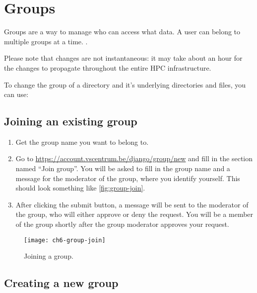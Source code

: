 \section{Groups}
\label{sec:vcs-groups}

Groups are a way to manage who can access what data. A user can belong to multiple
groups at a time. .

Please note that changes are not instantaneous: it may take about an hour for the changes to propagate
throughout the entire HPC infrastructure.

To change the group of a directory and it's underlying directories and files, you can use:

\begin{prompt}
\end{prompt}

\subsection{Joining an existing group}
\label{subsec:joining-existing-group}

\begin{enumerate}
    \item Get the group name you want to belong to.
    \item Go to \url{https://account.vscentrum.be/django/group/new} and fill in the
        section named ``Join group''. You will be asked to fill in the group name and a message for
        the moderator of the group, where you identify yourself. This should look something
        like \autoref{fig:group-join}.
    \item After clicking the submit button, a message will be sent to the moderator
        of the group, who will either approve or deny the request. You will be a member of the
        group shortly after the group moderator approves your request.
\end{enumerate}

\begin{figure}[!htbp]
  \caption{Joining a group.}
  \centering
    \texttt{[image: ch6-group-join]}
\end{figure}\label{fig:group-join}

\subsection{Creating a new group}

